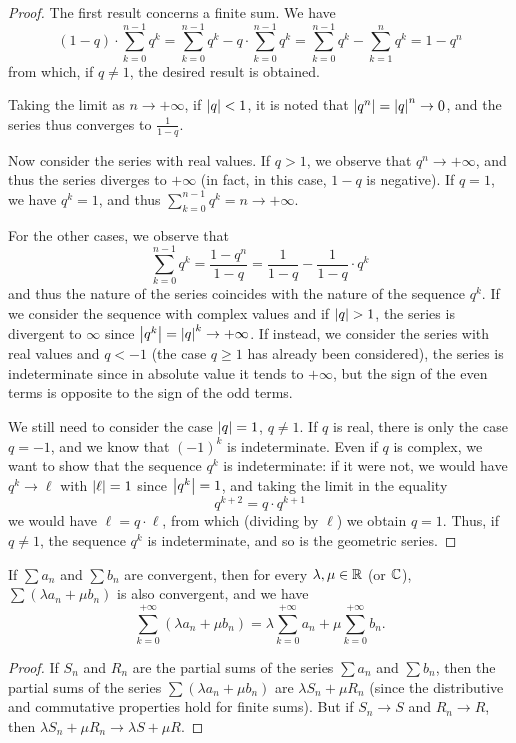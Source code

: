 \begin{proof}
The first result concerns a finite sum. We have
\[
  (1-q)\cdot \sum_{k=0}^{n-1} q^k
  = \sum_{k=0}^{n-1} q^k - q \cdot \sum_{k=0}^{n-1} q^k
  = \sum_{k=0}^{n-1} q^k - \sum_{k=1}^{n} q^k
  = 1 - q^n
\]
from which, if $q\neq 1$, the desired result is obtained.

Taking the limit as $n\to +\infty$, if ${\left|q\right|} < 1$, it is noted that
${\left|q^n\right|} = {\left|q\right|}^{n} \to 0$, and the series thus converges to $\frac
1{1-q}$.

Now consider the series with real values. If $q>1$, we observe that $q^n\to
+\infty$, and thus the series diverges to $+\infty$ (in fact, in this case,
$1-q$ is negative). If $q=1$, we have $q^k=1$, and thus
$\displaystyle\sum_{k=0}^{n-1} q^k = n \to +\infty$.

For the other cases, we observe that
\[
  \sum_{k=0}^{n-1} q^k = \frac{1-q^n}{1-q}
  = \frac{1}{1-q} - \frac{1}{1-q}\cdot q^k
\]
and thus the nature of the series coincides with the nature of the sequence
$q^k$. If we consider the sequence with complex values and if ${\left|q\right|}>1$, the
series is divergent to $\infty$ since ${\left|q^k\right|}={\left|q\right|}^k\to +\infty$. If
instead, we consider the series with real values and $q<-1$ (the case $q\ge 1$
has already been considered), the series is indeterminate since in absolute
value it tends to $+\infty$, but the sign of the even terms is opposite to the
sign of the odd terms.

We still need to consider the case ${\left|q\right|}=1$, $q\neq 1$. If $q$ is real, there
is only the case $q=-1$, and we know that $(-1)^k$ is indeterminate. Even if $q$
is complex, we want to show that the sequence $q^k$ is indeterminate: if it were
not, we would have $q^k\to \ell$ with ${\left|\ell\right|}=1$ since ${\left|q^k\right|}=1$, and
taking the limit in the equality
\[
  q^{k+2} = q\cdot q^{k+1}
\]
we would have $\ell = q\cdot \ell$, from which (dividing by $\ell$) we obtain
$q=1$. Thus, if $q\neq 1$, the sequence $q^k$ is indeterminate, and so is the
geometric series.
\end{proof}

\begin{theorem}
\label{th:linearita_somma_serie}%
%
If $\sum a_n$ and $\sum b_n$ are convergent, then for every $\lambda,\mu\in {\mathbb R}$
(or ${\mathbb C}$), $\sum (\lambda a_n + \mu b_n)$ is also convergent, and we have
\[
 \sum_{k=0}^{+\infty} (\lambda a_n + \mu b_n)
 = \lambda \sum_{k=0}^{+\infty} a_n  + \mu \sum_{k=0}^{+\infty} b_n.
\]
\end{theorem}
%
\begin{proof}
If $S_n$ and $R_n$ are the partial sums of the series $\sum a_n$ and $\sum b_n$,
then the partial sums of the series $\sum (\lambda a_n + \mu b_n)$ are $\lambda
S_n + \mu R_n$ (since the distributive and commutative properties hold for
finite sums). But if $S_n \to S$ and $R_n \to R$, then $\lambda S_n + \mu R_n
\to \lambda S + \mu R$.
\end{proof}

